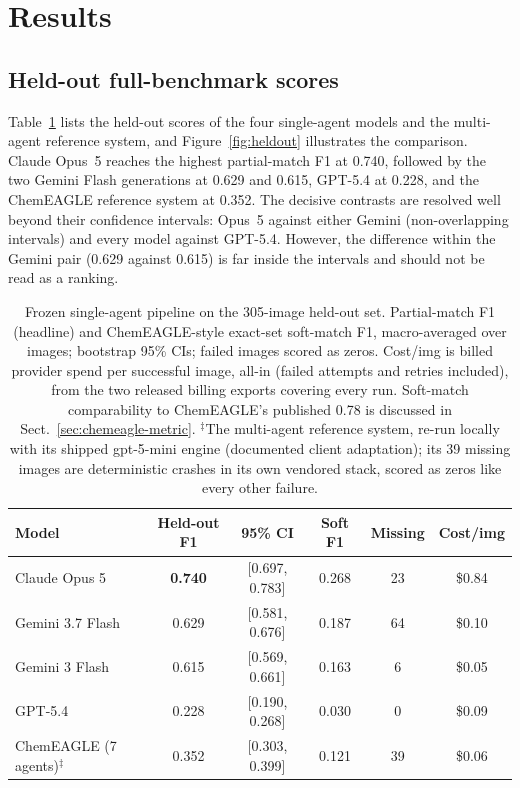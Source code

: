 \documentclass{article}
\begin{document}
\section{Results}
\label{sec:results}

\subsection{Held-out full-benchmark scores}

Table~\ref{tab:main} lists the held-out scores of the four single-agent
models and the multi-agent reference system, and
Figure~\ref{fig:heldout} illustrates the comparison. Claude Opus~5
reaches the highest partial-match F1 at 0.740, followed by the two
Gemini Flash generations at 0.629 and 0.615, GPT-5.4 at 0.228, and the
ChemEAGLE reference system at 0.352. The decisive contrasts are
resolved well beyond their confidence intervals: Opus~5 against either
Gemini (non-overlapping intervals) and every model against GPT-5.4.
However, the difference within the Gemini pair (0.629 against 0.615)
is far inside the intervals and should not be read as a ranking.

\begin{table}[htb]
\centering
\caption{Frozen single-agent pipeline on the 305-image held-out set.
Partial-match F1 (headline) and ChemEAGLE-style exact-set soft-match
F1, macro-averaged over images; bootstrap 95\% CIs; failed images
scored as zeros.
Cost/img is billed provider spend per successful image, all-in
(failed attempts and retries included), from the two released billing
exports covering every run.
Soft-match comparability to ChemEAGLE's published 0.78 is discussed in
Sect.~\ref{sec:chemeagle-metric}. $^{\ddag}$The multi-agent reference
system, re-run locally with its shipped gpt-5-mini engine (documented
client adaptation); its 39 missing images are deterministic crashes in
its own vendored stack, scored as zeros like every other failure.}
\label{tab:main}
\begin{tabular}{lccccc}
\toprule
Model & Held-out F1 & 95\% CI & Soft F1 & Missing & Cost/img \\
\midrule
Claude Opus 5      & \textbf{0.740} & [0.697, 0.783] & 0.268 & 23 & \$0.84 \\
Gemini 3.7 Flash   & 0.629 & [0.581, 0.676] & 0.187 & 64 & \$0.10 \\
Gemini 3 Flash     & 0.615 & [0.569, 0.661] & 0.163 & 6 & \$0.05 \\
GPT-5.4            & 0.228 & [0.190, 0.268] & 0.030 & 0 & \$0.09 \\
\midrule
ChemEAGLE (7 agents)$^{\ddag}$ & 0.352 & [0.303, 0.399] & 0.121 & 39 & \$0.06 \\
\bottomrule
\end{tabular}
\end{table}
\end{document}
